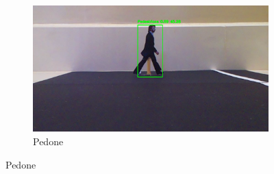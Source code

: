 \documentclass{article}
\begin{document}
\begin{figure}[h!]
    \centering
    \captionsetup[subfigure]{labelformat=parens,labelsep=space}
    \begin{subfigure}[b]{\textwidth}
        \centering
        \includegraphics[width=0.9\linewidth]{pedone.png}
        \caption{Pedone} 
        \label{fig:pedone}
    \end{subfigure}

    \vspace{0.8em} 


\end{figure}
\end{document}
